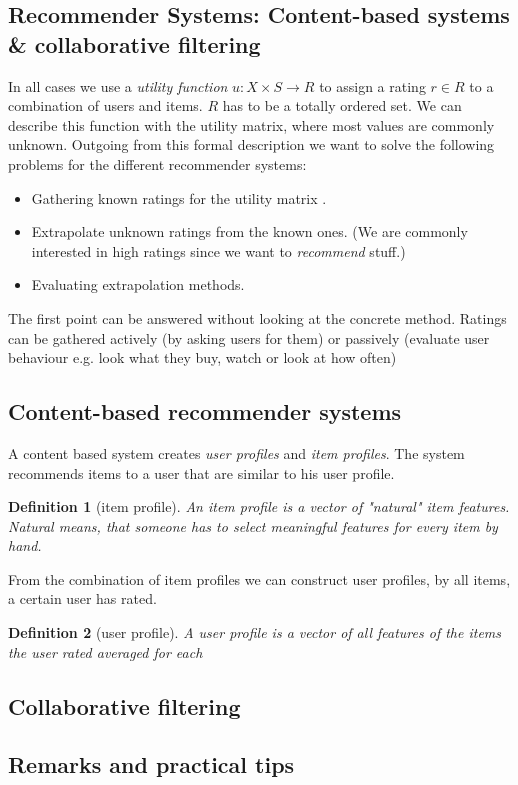 \documentclass[]{article}
\newtheorem{defi}{Definition}
\begin{document}
\subsection{Recommender Systems: Content-based systems \& collaborative filtering}
In all cases we use a \emph{utility function} $u: X \times S \rightarrow R$ to assign a rating  $r \in R$ to a combination of users and items. $R$ has to be a totally ordered set. We can describe this function with the utility matrix, where most values are commonly unknown. Outgoing from this formal description we want to solve the following problems for the different recommender systems:
\begin{itemize}
\item Gathering known ratings for the utility matrix .
\item Extrapolate unknown ratings from the known ones. (We are commonly interested in high ratings since we want to \emph{recommend} stuff.)
\item Evaluating extrapolation methods.
\end{itemize}
The first point can be answered without looking at the concrete method. Ratings can be gathered actively (by asking users for them) or passively (evaluate user behaviour e.g. look what they buy, watch or look at how often) 
\subsection{Content-based recommender systems}
A content based system creates \emph{user profiles} and \emph{item profiles}. The system recommends items to a user that are similar to his user profile.
\begin{defi}[item profile]
An \emph{item profile} is a vector of "natural" item features. Natural means, that someone has to select meaningful features for every item by hand.
\end{defi}
From the combination of item profiles we can construct user profiles, by all items, a certain user has rated.
\begin{defi}[user profile]
A \emph{user profile} is a vector of all features of the items the user rated averaged for each
\end{defi}
\subsection{Collaborative filtering}

\subsection{Remarks and practical tips}
\end{document}

